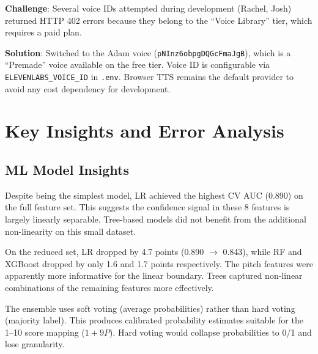 \documentclass[12pt,a4paper]{article}
\begin{document}
\textbf{Challenge}: Several voice IDs attempted during development (Rachel, Josh) returned HTTP 402 errors because they belong to the ``Voice Library'' tier, which requires a paid plan.

\textbf{Solution}: Switched to the Adam voice (\texttt{pNInz6obpgDQGcFmaJgB}), which is a ``Premade'' voice available on the free tier. Voice ID is configurable via \texttt{ELEVENLABS\_VOICE\_ID} in \texttt{.env}. Browser TTS remains the default provider to avoid any cost dependency for development.

\section{Key Insights and Error Analysis}

\subsection{ML Model Insights}

\begin{infobox}
Despite being the simplest model, LR achieved the highest CV AUC (0.890) on the full feature set. This suggests the confidence signal in these 8 features is largely linearly separable. Tree-based models did not benefit from the additional non-linearity on this small dataset.
\end{infobox}

\begin{infobox}
On the reduced set, LR dropped by 4.7 points (0.890 $\rightarrow$ 0.843), while RF and XGBoost dropped by only 1.6 and 1.7 points respectively. The pitch features were apparently more informative for the linear boundary. Trees captured non-linear combinations of the remaining features more effectively.
\end{infobox}

\begin{infobox}
The ensemble uses soft voting (average probabilities) rather than hard voting (majority label). This produces calibrated probability estimates suitable for the 1--10 score mapping ($1 + 9P$). Hard voting would collapse probabilities to 0/1 and lose granularity.
\end{infobox}
\end{document}
